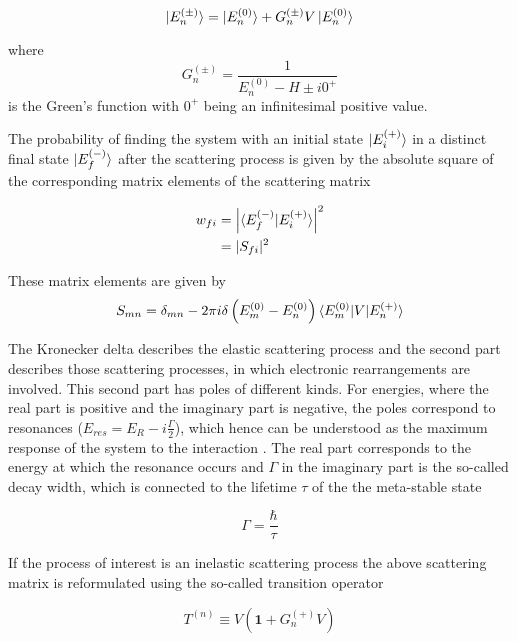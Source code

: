 \begin{equation} \label{equation:LippmannSchwinger}
 \ket{E_n^{(\pm)}} =  \ket{E_n^{(0)}} + G_n^{(\pm)}V \ket{E_n^{(0)}}
\end{equation}

where
\begin{equation}
 G_n^{(\pm)} = \frac{1}{E_n^{(0)}-H \pm i0^+}
\end{equation}
is the Green's function with $0^+$ being an infinitesimal positive value.

The probability of finding the system with an initial state $\ket{E_i^{(+)}}$
in a distinct final state $\ket{E_f^{(-)}}$ after the scattering process
is given by the absolute square of the corresponding matrix elements
of the scattering matrix

\begin{align}
 {w}_{fi} &= \left | \braket{E_f^{(-)} | E_i^{(+)}} \right|^2\\
                  &= |S_{fi}|^2
\end{align}

These matrix elements are given by
\begin{equation}
 S_{mn} = \delta_{mn} - 2\pi i \delta \left(E_m^{(0)} - E_n^{(0)} \right)
          \braket{E_m^{(0)}| V |E_n^{(+)}}
\end{equation}

The Kronecker delta describes the elastic scattering process and the second
part describes those scattering processes, in which electronic rearrangements
are involved. This second part has poles of different kinds. For energies,
where the real part is positive and the imaginary part is negative, the poles
correspond to resonances ($E_{res}=E_R - i\frac{\Gamma}{2}$),
which hence can be understood as the maximum
response of the system to the interaction \cite{Klaiman12}. 
The real part corresponds to the
energy at which the resonance occurs and $\Gamma$ in the imaginary part
is the so-called decay width, which is connected to the lifetime
$\tau$ of the the meta-stable state

\begin{equation}
 \Gamma = \frac{\hbar}{\tau}
\end{equation}

If the process of interest is an inelastic scattering process the
above scattering matrix is reformulated using the so-called transition
operator

\begin{equation}
 T^{(n)} \equiv V \left( \mathbf{1} + G_n^{(+)} V \right)
\end{equation}

